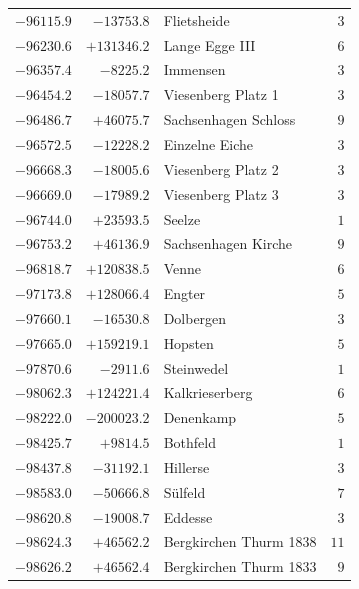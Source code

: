 \begin{center}
\begin{tabular}{r|r|p{170pt}|r}
\(-96115.9\)&\(-13753.8\)&Flietsheide&\(3\)\\
\(-96230.6\)&\(+131346.2\)&Lange Egge III&\(6\)\\
\(-96357.4\)&\(-8225.2\)&Immensen&\(3\)\\
\(-96454.2\)&\(-18057.7\)&Viesenberg Platz 1&\(3\)\\
\(-96486.7\)&\(+46075.7\)&Sachsenhagen Schloss&\(9\)\\
\(-96572.5\)&\(-12228.2\)&Einzelne Eiche&\(3\)\\
\(-96668.3\)&\(-18005.6\)&Viesenberg Platz 2&\(3\)\\
\(-96669.0\)&\(-17989.2\)&Viesenberg Platz 3&\(3\)\\
\(-96744.0\)&\(+23593.5\)&Seelze&\(1\)\\
\(-96753.2\)&\(+46136.9\)&Sachsenhagen Kirche&\(9\)\\
\(-96818.7\)&\(+120838.5\)&Venne&\(6\)\\
\(-97173.8\)&\(+128066.4\)&Engter&\(5\)\\
\(-97660.1\)&\(-16530.8\)&Dolbergen&\(3\)\\
\(-97665.0\)&\(+159219.1\)&Hopsten&\(5\)\\
\(-97870.6\)&\(-2911.6\)&Steinwedel&\(1\)\\
\(-98062.3\)&\(+124221.4\)&Kalkrieserberg&\(6\)\\
\(-98222.0\)&\(-200023.2\)&Denenkamp&\(5\)\\
\(-98425.7\)&\(+9814.5\)&Bothfeld&\(1\)\\
\(-98437.8\)&\(-31192.1\)&Hillerse&\(3\)\\
\(-98583.0\)&\(-50666.8\)&Sülfeld&\(7\)\\
\(-98620.8\)&\(-19008.7\)&Eddesse&\(3\)\\
\(-98624.3\)&\(+46562.2\)&Bergkirchen Thurm 1838&\(11\)\\
\(-98626.2\)&\(+46562.4\)&Bergkirchen Thurm 1833&\(9\)\\
\hline\end{tabular}\endgroup\end{center}
